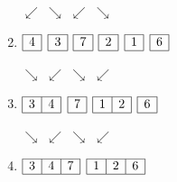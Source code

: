 \documentclass[12pt, letterpaper]{article}
\begin{document}
\begin{minipage}{0.8\textwidth}
\begin{enumerate}
		$\swarrow$
		\hspace{0.1cm}$\searrow$
		\hspace{0.85cm}$\swarrow$
		\hspace{0.1cm}$\searrow$
		\item
		$\begin{array}{|c|}
			\hline
			4 \\
			\hline
		\end{array}$
		$\begin{array}{|c|}
			\hline
			3 \\
			\hline
		\end{array}$
		$\begin{array}{|c|}
			\hline
			7 \\
			\hline
		\end{array}$
		$\begin{array}{|c|}
			\hline
			2 \\
			\hline
		\end{array}$
		$\begin{array}{|c|}
			\hline
			1 \\
			\hline
		\end{array}$
		$\begin{array}{|c|}
			\hline
			6 \\
			\hline
		\end{array}$
		
		\hspace{0.1cm}$\searrow$
		\hspace{0.2cm}$\swarrow$
		\hspace{0.85cm}$\searrow$
		\hspace{0.1cm}$\swarrow$
		\item
		$\begin{array}{|l|r|}
			\hline
			3 & 4 \\
			\hline
		\end{array}$
		$\begin{array}{|c|}
			\hline
			7 \\
			\hline
		\end{array}$
		$\begin{array}{|l|r|}
			\hline
			1 & 2 \\
			\hline
		\end{array}$
		$\begin{array}{|c|}
			\hline
			6 \\
			\hline
		\end{array}$
		
		\hspace{0.3cm}$\searrow$
		\hspace{0.3cm}$\swarrow$
		\hspace{0.6cm}$\searrow$
		\hspace{0.1cm}$\swarrow$
		\item
		$\begin{array}{|l|c|r|}
			\hline
			3 & 4 & 7 \\
			\hline
		\end{array}$
		$\begin{array}{|l|c|r|}
			\hline
			1 & 2 & 6 \\
			\hline
		\end{array}$
		

\end{enumerate}
\end{minipage}
\end{document}

